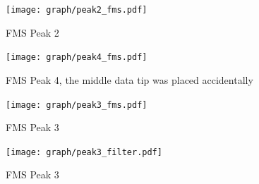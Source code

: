 \begin{figure}[p]
	\centering
	\texttt{[image: graph/peak2\_fms.pdf]}
	\vspace{-2ex}
	\caption{FMS Peak 2}
	\label{fig:P2_fms}
	\vspace{2ex}

	\texttt{[image: graph/peak4\_fms.pdf]}
	\vspace{-2ex}
	\caption{FMS Peak 4, the middle data tip was placed accidentally}
	\label{fig:P4_fms}
	\vspace{-2em}
\end{figure}

\begin{figure}[p]
	\centering
	\texttt{[image: graph/peak3\_fms.pdf]}
	\vspace{-2ex}
	\caption{FMS Peak 3}
	\label{fig:P3_fms}
	\vspace{2ex}

	\texttt{[image: graph/peak3\_filter.pdf]}
	\vspace{-2ex}
	\caption{FMS Peak 3}
	\label{fig:P3_filter}
	\vspace{-2em}
\end{figure}
